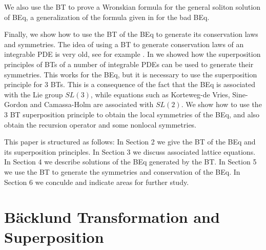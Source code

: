 \documentclass[12pt]{article}
\begin{document}
We also use the BT to prove a Wronskian formula for
the general soliton solution of BEq, a generalization of the formula given in \cite{beq20} for the bad BEq. 

Finally, we show how to use the BT of the BEq to generate its conservation laws and symmetries.
The idea of using a BT to generate
conservation laws of an integrable PDE is very old, see for example \cite{beq44}. In \cite{rs1} we showed how the
superposition principles of BTs of a number of integrable PDEs can be used to generate their symmetries. This
works for the BEq, but it is necessary to use the superposition principle for 3 BTs. This is a
consequence of the fact that the BEq is associated with the Lie group $SL(3)$, while 
equations such as Korteweg-de Vries, Sine-Gordon and Camassa-Holm are associated with $SL(2)$. We show how
to use the 3 BT superposition principle to obtain the local symmetries of the BEq, and also obtain the recursion operator 
and some nonlocal symmetries. 

This paper is structured as follows: In Section 2 we give the BT of the BEq and its superposition principles.
In Section 3 we discuss associated lattice equations. In Section 4 we describe solutions of the BEq generated
by the BT. In Section 5 we use the BT to generate the symmetries and conservation of the BEq. In Section 6
we conculde and indicate areas for further study. 

\section{\bf B\"acklund Transformation and Superposition} 
 
\end{document}

